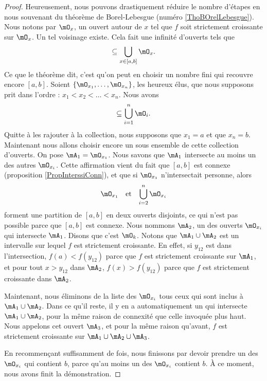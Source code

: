 \begin{proof}
    Heureusement, nous pouvons drastiquement réduire le nombre d'étapes en nous souvenant du théorème de Borel-Lebesgue (numéro \ref{ThoBOrelLebesgue}). Nous notons par $\mO_x$, un ouvert autour de $x$ tel que $f$ soit strictement croissante sur $\mO_x$. Un tel voisinage existe. Cela fait une infinité d'ouverts tels que
    \begin{equation}
        [a,b]\subseteq\bigcup_{x\in[a,b]}\mO_x.
    \end{equation}
    Ce que le théorème dit, c'est qu'on peut en choisir un nombre fini qui recouvre encore $[a,b]$. Soient $\{ \mO_{x_1},\ldots,\mO_{x_n} \}$, les heureux élus, que nous supposons prit dans l'ordre : $x_1<x_2<\ldots<x_n$. Nous avons
    \begin{equation}
        [a,b]\subseteq\bigcup_{i=1}^n\mO_i.
    \end{equation}
    Quitte à les rajouter à la collection, nous supposons que $x_1=a$ et que $x_n=b$. Maintenant nous allons choisir encore un sous ensemble de cette collection d'ouverts. On pose $\mA_1=\mO_{x_1}$. Nous savons que $\mA_1$ intersecte au moins un des autres $\mO_{x_i}$. Cette affirmation vient du fait que $[a,b]$ est connexe (proposition \ref{PropInterssiConn}), et que si $\mO_{x_1}$ n'intersectait personne, alors 
    \begin{equation}
        \begin{aligned}[]
            \mO_{x_1}&&\text{et}&&\bigcup_{i=2}^n\mO_{x_i}
        \end{aligned}
    \end{equation}
    forment une partition de $[a,b]$ en deux ouverts disjoints, ce qui n'est pas possible parce que $[a,b]$ est connexe. Nous nommons $\mA_2$, un des ouverts $\mO_{x_i}$ qui intersecte $\mA_1$. Disons que c'est $\mO_k$. Notons que $\mA_1\cup\mA_2$ est un intervalle sur lequel $f$ est strictement croissante. En effet, si $y_{12}$ est dans l'intersection, $f(a)<f(y_{12})$ parce que $f$ est strictement croissante sur $\mA_1$, et pour tout $x>y_{12}$ dans $\mA_2$, $f(x)>f(y_{12})$ parce que $f$ est strictement croissante dans $\mA_2$. 

    Maintenant, nous éliminons de la liste des $\mO_{x_i}$ tous ceux qui sont inclus à $\mA_1\cup\mA_2$. Dans ce qu'il reste, il y en a automatiquement un qui intersecte $\mA_1\cup\mA_2$, pour la même raison de connexité que celle invoquée plus haut. Nous appelons cet ouvert $\mA_3$, et pour la même raison qu'avant, $f$ est strictement croissante sur $\mA_1\cup\mA_2\cup\mA_3$.

    En recommençant suffisamment de fois, nous finissons par devoir prendre un des $\mO_{x_i}$ qui contient $b$, parce qu'au moins un des $\mO_{x_i}$ contient $b$. À ce moment, nous avons finit la démonstration.
\end{proof}

